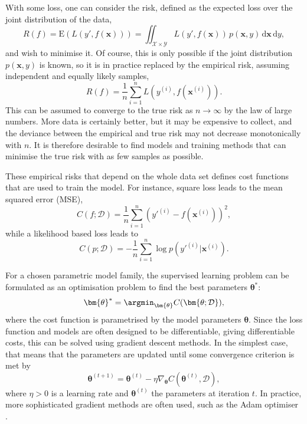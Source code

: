 With some loss, one can consider the risk, defined as the expected loss over the joint distribution of the data,
\begin{equation}
    R(f)
    = \text{E}(L(y', f(\bm{x})))
    = \iint_{\mathcal{X}\times\mathcal{Y}} L(y', f(\bm{x})) \, p(\bm{x}, y) \, \mathrm{d}\bm{x} \, \mathrm{d}y,
    \label{eq:risk}
\end{equation}
and wish to minimise it.
Of course, this is only possible if the joint distribution $p(\bm{x}, y)$ is known, so it is in practice replaced by the empirical risk, assuming independent and equally likely samples,
\begin{equation}
    \label{eq:empirical_risk}
    \hat{R}(f) = \frac{1}{n} \sum_{i=1}^n L(y^{(i)}, f(\bm{x}^{(i)})).
\end{equation}
This can be assumed to converge to the true risk as $n\to\infty$ by the law of large numbers.
More data is certainly better, but it may be expensive to collect, and the deviance between the empirical and true risk may not decrease monotonically with $n$.
It is therefore desirable to find models and training methods that can minimise the true risk with as few samples as possible.

These empirical risks that depend on the whole data set defines cost functions that are used to train the model.
For instance, square loss leads to the mean squared error (MSE),
\begin{equation}
    C(f;\mathcal{D}) = \frac{1}{n} \sum_{i=1}^n (y'^{(i)} - f(\bm{x}^{(i)}))^2,
\end{equation}
while a likelihood based loss leads to
\begin{equation}
    C(p;\mathcal{D}) = -\frac{1}{n} \sum_{i=1}^n \log p(y'^{(i)}|\bm{x}^{(i)}).
\end{equation}

For a chosen parametric model family, the supervised learning problem can be formulated as an optimisation problem to find the best parameters $\bm{\theta}^*$:
\begin{equation}
    \bm{\theta}^* = \argmin_{\bm{\theta}} C(\bm{\theta; \mathcal{D}}),
\end{equation}
where the cost function is parametrised by the model parameters $\bm{\theta}$.
Since the loss function and models are often designed to be differentiable, giving differentiable costs, this can be solved using gradient descent methods.
In the simplest case, that means that the parameters are updated until some convergence criterion is met by
\begin{equation}
    \bm{\theta}^{(t+1)} = \bm{\theta}^{(t)} - \eta \nabla_{\bm{\theta}} C(\bm{\theta}^{(t)}, \mathcal{D}),
\end{equation}
where $\eta>0$ is a learning rate and $\bm{\theta}^{(t)}$ the parameters at iteration $t$.
In practice, more sophisticated gradient methods are often used, such as the Adam optimiser \cite{adamoptimiser}.

